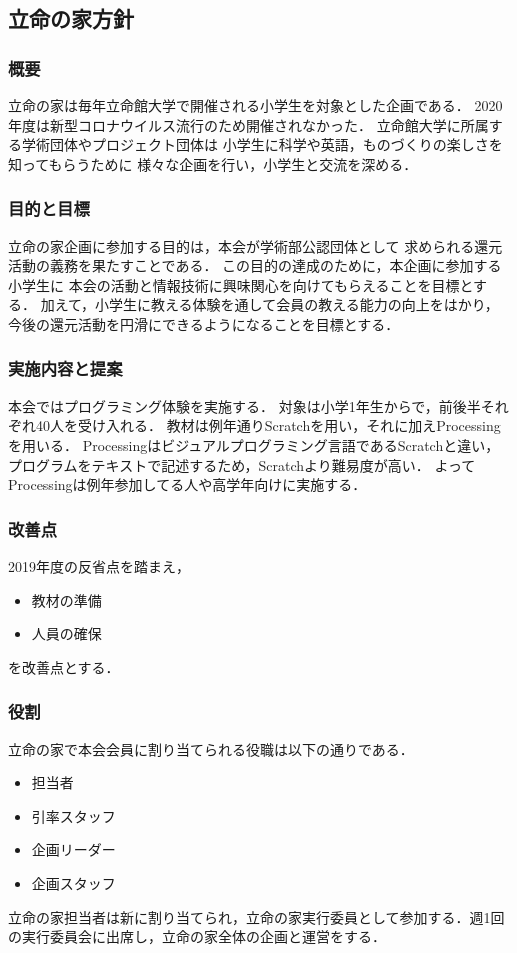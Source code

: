 \subsection*{立命の家方針}

\subsubsection*{概要}
立命の家は毎年立命館大学で開催される小学生を対象とした企画である．
2020年度は新型コロナウイルス流行のため開催されなかった．
立命館大学に所属する学術団体やプロジェクト団体は
小学生に科学や英語，ものづくりの楽しさを知ってもらうために
様々な企画を行い，小学生と交流を深める．

\subsubsection*{目的と目標}
立命の家企画に参加する目的は，本会が学術部公認団体として
求められる還元活動の義務を果たすことである．
この目的の達成のために，本企画に参加する小学生に
本会の活動と情報技術に興味関心を向けてもらえることを目標とする．
加えて，小学生に教える体験を通して会員の教える能力の向上をはかり，
今後の還元活動を円滑にできるようになることを目標とする．

\subsubsection*{実施内容と提案}
本会ではプログラミング体験を実施する．
対象は小学1年生からで，前後半それぞれ40人を受け入れる．
教材は例年通りScratchを用い，それに加えProcessingを用いる．
Processingはビジュアルプログラミング言語であるScratchと違い，
プログラムをテキストで記述するため，Scratchより難易度が高い．
よってProcessingは例年参加してる人や高学年向けに実施する．

\subsubsection*{改善点}
2019年度の反省点を踏まえ，
\begin{itemize}
  \item 教材の準備
  \item 人員の確保
\end{itemize}
を改善点とする．

\subsubsection*{役割}
立命の家で本会会員に割り当てられる役職は以下の通りである．
\begin{itemize}
  \item 担当者
  \item 引率スタッフ
  \item 企画リーダー
  \item 企画スタッフ
\end{itemize} \par
立命の家担当者は新\secondGrade{}に割り当てられ，立命の家実行委員として参加する．週1回の実行委員会に出席し，立命の家全体の企画と運営をする．

